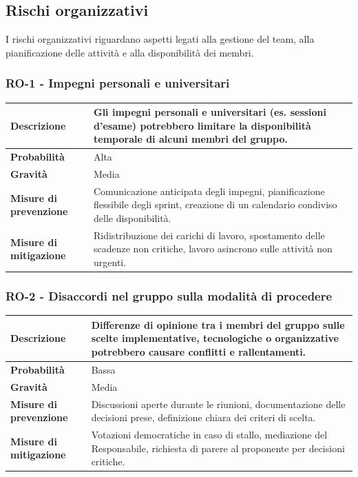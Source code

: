 \documentclass[11pt,a4paper]{article}
\begin{document}
\subsection{Rischi organizzativi}
I rischi organizzativi riguardano aspetti legati alla gestione del team, alla pianificazione delle attività e alla disponibilità dei membri.

\subsubsection{RO-1 - Impegni personali e universitari}
\begin{center}
\begin{tabular}{|p{3cm}|p{12cm}|}
    \hline
    \textbf{Descrizione} & Gli impegni personali e universitari (es. sessioni d'esame) potrebbero limitare la disponibilità temporale di alcuni membri del gruppo. \\
    \hline
    \textbf{Probabilità} & Alta \\
    \hline
    \textbf{Gravità} & Media \\
    \hline
    \textbf{Misure di prevenzione} & Comunicazione anticipata degli impegni, pianificazione flessibile degli sprint, creazione di un calendario condiviso delle disponibilità. \\
    \hline
    \textbf{Misure di mitigazione} & Ridistribuzione dei carichi di lavoro, spostamento delle scadenze non critiche, lavoro asincrono sulle attività non urgenti. \\
    \hline
\end{tabular}
\end{center}

\subsubsection{RO-2 - Disaccordi nel gruppo sulla modalità di procedere}
\begin{center}
\begin{tabular}{|p{3cm}|p{12cm}|}
    \hline
    \textbf{Descrizione} & Differenze di opinione tra i membri del gruppo sulle scelte implementative, tecnologiche o organizzative potrebbero causare conflitti e rallentamenti. \\
    \hline
    \textbf{Probabilità} & Bassa \\
    \hline
    \textbf{Gravità} & Media \\
    \hline
    \textbf{Misure di prevenzione} & Discussioni aperte durante le riunioni, documentazione delle decisioni prese, definizione chiara dei criteri di scelta. \\
    \hline
    \textbf{Misure di mitigazione} & Votazioni democratiche in caso di stallo, mediazione del Responsabile, richiesta di parere al proponente per decisioni critiche. \\
    \hline
\end{tabular}
\end{center}
\end{document}
